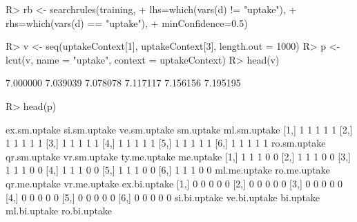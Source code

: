 \documentclass{article}\usepackage[]{graphicx}\usepackage[]{color}
\begin{document}
\begin{Schunk}
% --begin: "pbld4"
\begin{Sinput}
R> rb <- searchrules(training,
+                    lhs=which(vars(d) != "uptake"),
+                    rhs=which(vars(d) == "uptake"),
+                    minConfidence=0.5)
\end{Sinput}
%
% --end: "pbld4"
\end{Schunk}

\begin{Schunk}
% --begin: "pbld5"
\begin{Sinput}
R> v <- seq(uptakeContext[1], uptakeContext[3], length.out = 1000)
R> p <- lcut(v, name = "uptake", context = uptakeContext)
R> head(v)
\end{Sinput}
\begin{Soutput}
[1] 7.000000 7.039039 7.078078 7.117117 7.156156 7.195195
\end{Soutput}
\begin{Sinput}
R> head(p)
\end{Sinput}
\begin{Soutput}
     ex.sm.uptake si.sm.uptake ve.sm.uptake sm.uptake ml.sm.uptake
[1,]            1            1            1         1            1
[2,]            1            1            1         1            1
[3,]            1            1            1         1            1
[4,]            1            1            1         1            1
[5,]            1            1            1         1            1
[6,]            1            1            1         1            1
     ro.sm.uptake qr.sm.uptake vr.sm.uptake ty.me.uptake me.uptake
[1,]            1            1            1            0         0
[2,]            1            1            1            0         0
[3,]            1            1            1            0         0
[4,]            1            1            1            0         0
[5,]            1            1            1            0         0
[6,]            1            1            1            0         0
     ml.me.uptake ro.me.uptake qr.me.uptake vr.me.uptake ex.bi.uptake
[1,]            0            0            0            0            0
[2,]            0            0            0            0            0
[3,]            0            0            0            0            0
[4,]            0            0            0            0            0
[5,]            0            0            0            0            0
[6,]            0            0            0            0            0
     si.bi.uptake ve.bi.uptake bi.uptake ml.bi.uptake ro.bi.uptake

\end{Soutput}
\end{Schunk}
\end{document}
